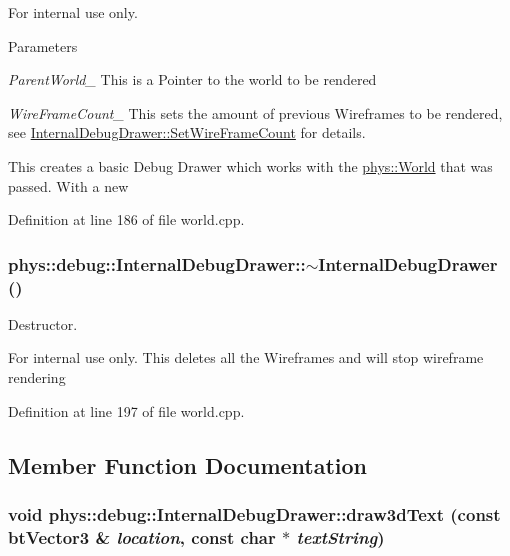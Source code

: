 \begin{DoxyInternal}{For internal use only.}

\begin{DoxyParams}{Parameters}
\item[{\em ParentWorld\_\-}]This is a Pointer to the world to be rendered \item[{\em WireFrameCount\_\-}]This sets the amount of previous Wireframes to be rendered, see \hyperlink{classphys_1_1debug_1_1InternalDebugDrawer_a76922fda7bb3b59d301e50d67e4f3c72}{InternalDebugDrawer::SetWireFrameCount} for details.\end{DoxyParams}
This creates a basic Debug Drawer which works with the \hyperlink{classphys_1_1World}{phys::World} that was passed. With a new \end{DoxyInternal}


Definition at line 186 of file world.cpp.

\hypertarget{classphys_1_1debug_1_1InternalDebugDrawer_a9b5cb5ec48541effddb305de12508323}{
\subsubsection[{$\sim$InternalDebugDrawer}]{\setlength{\rightskip}{0pt plus 5cm}phys::debug::InternalDebugDrawer::$\sim$InternalDebugDrawer ()}}
\label{db/d27/classphys_1_1debug_1_1InternalDebugDrawer_a9b5cb5ec48541effddb305de12508323}


Destructor. 

\begin{DoxyInternal}{For internal use only.}
This deletes all the Wireframes and will stop wireframe rendering \end{DoxyInternal}


Definition at line 197 of file world.cpp.



\subsection{Member Function Documentation}
\hypertarget{classphys_1_1debug_1_1InternalDebugDrawer_a1266d3fad8868ade2d515e9c92e76b4a}{
\subsubsection[{draw3dText}]{\setlength{\rightskip}{0pt plus 5cm}void phys::debug::InternalDebugDrawer::draw3dText (const btVector3 \& {\em location}, \/  const char $\ast$ {\em textString})}}
\label{db/d27/classphys_1_1debug_1_1InternalDebugDrawer_a1266d3fad8868ade2d515e9c92e76b4a}


